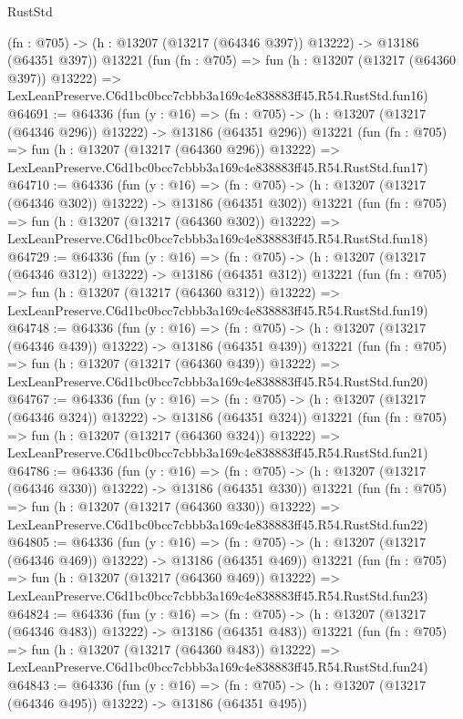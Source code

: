 \begin{lexlean}{RustStd}
\begin{coremodule}
    (fn : @705) -> (h : @13207 (@13217 (@64346 @397)) @13222) -> @13186 (@64351 @397))
    @13221
    (fun (fn : @705) =>
    fun (h : @13207 (@13217 (@64360 @397)) @13222) =>
    LexLeanPreserve.C6d1bc0bcc7cbbb3a169c4e838883ff45.R54.RustStd.fun16)
@64691 := @64336
    (fun (y : @16) =>
    (fn : @705) -> (h : @13207 (@13217 (@64346 @296)) @13222) -> @13186 (@64351 @296))
    @13221
    (fun (fn : @705) =>
    fun (h : @13207 (@13217 (@64360 @296)) @13222) =>
    LexLeanPreserve.C6d1bc0bcc7cbbb3a169c4e838883ff45.R54.RustStd.fun17)
@64710 := @64336
    (fun (y : @16) =>
    (fn : @705) -> (h : @13207 (@13217 (@64346 @302)) @13222) -> @13186 (@64351 @302))
    @13221
    (fun (fn : @705) =>
    fun (h : @13207 (@13217 (@64360 @302)) @13222) =>
    LexLeanPreserve.C6d1bc0bcc7cbbb3a169c4e838883ff45.R54.RustStd.fun18)
@64729 := @64336
    (fun (y : @16) =>
    (fn : @705) -> (h : @13207 (@13217 (@64346 @312)) @13222) -> @13186 (@64351 @312))
    @13221
    (fun (fn : @705) =>
    fun (h : @13207 (@13217 (@64360 @312)) @13222) =>
    LexLeanPreserve.C6d1bc0bcc7cbbb3a169c4e838883ff45.R54.RustStd.fun19)
@64748 := @64336
    (fun (y : @16) =>
    (fn : @705) -> (h : @13207 (@13217 (@64346 @439)) @13222) -> @13186 (@64351 @439))
    @13221
    (fun (fn : @705) =>
    fun (h : @13207 (@13217 (@64360 @439)) @13222) =>
    LexLeanPreserve.C6d1bc0bcc7cbbb3a169c4e838883ff45.R54.RustStd.fun20)
@64767 := @64336
    (fun (y : @16) =>
    (fn : @705) -> (h : @13207 (@13217 (@64346 @324)) @13222) -> @13186 (@64351 @324))
    @13221
    (fun (fn : @705) =>
    fun (h : @13207 (@13217 (@64360 @324)) @13222) =>
    LexLeanPreserve.C6d1bc0bcc7cbbb3a169c4e838883ff45.R54.RustStd.fun21)
@64786 := @64336
    (fun (y : @16) =>
    (fn : @705) -> (h : @13207 (@13217 (@64346 @330)) @13222) -> @13186 (@64351 @330))
    @13221
    (fun (fn : @705) =>
    fun (h : @13207 (@13217 (@64360 @330)) @13222) =>
    LexLeanPreserve.C6d1bc0bcc7cbbb3a169c4e838883ff45.R54.RustStd.fun22)
@64805 := @64336
    (fun (y : @16) =>
    (fn : @705) -> (h : @13207 (@13217 (@64346 @469)) @13222) -> @13186 (@64351 @469))
    @13221
    (fun (fn : @705) =>
    fun (h : @13207 (@13217 (@64360 @469)) @13222) =>
    LexLeanPreserve.C6d1bc0bcc7cbbb3a169c4e838883ff45.R54.RustStd.fun23)
@64824 := @64336
    (fun (y : @16) =>
    (fn : @705) -> (h : @13207 (@13217 (@64346 @483)) @13222) -> @13186 (@64351 @483))
    @13221
    (fun (fn : @705) =>
    fun (h : @13207 (@13217 (@64360 @483)) @13222) =>
    LexLeanPreserve.C6d1bc0bcc7cbbb3a169c4e838883ff45.R54.RustStd.fun24)
@64843 := @64336
    (fun (y : @16) =>
    (fn : @705) -> (h : @13207 (@13217 (@64346 @495)) @13222) -> @13186 (@64351 @495))

\end{coremodule}
\end{lexlean}
